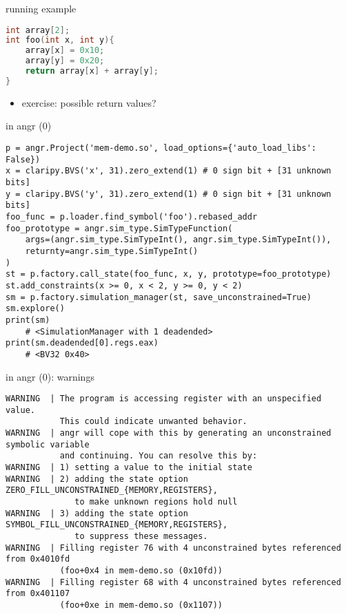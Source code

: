\begin{frame}[fragile]{running example}
\begin{lstlisting}[language=C,style=script]
int array[2];
int foo(int x, int y){
    array[x] = 0x10;
    array[y] = 0x20;
    return array[x] + array[y];
}
\end{lstlisting}
\begin{itemize}
\item exercise: possible return values?
\end{itemize}
\end{frame}

\begin{frame}[fragile]{in angr (0)}
\begin{Verbatim}[fontsize=\fontsize{9}{10}\selectfont]
p = angr.Project('mem-demo.so', load_options={'auto_load_libs': False})
x = claripy.BVS('x', 31).zero_extend(1) # 0 sign bit + [31 unknown bits]
y = claripy.BVS('y', 31).zero_extend(1) # 0 sign bit + [31 unknown bits]
foo_func = p.loader.find_symbol('foo').rebased_addr
foo_prototype = angr.sim_type.SimTypeFunction(
    args=(angr.sim_type.SimTypeInt(), angr.sim_type.SimTypeInt()),
    returnty=angr.sim_type.SimTypeInt()
)
st = p.factory.call_state(foo_func, x, y, prototype=foo_prototype)
st.add_constraints(x >= 0, x < 2, y >= 0, y < 2)
sm = p.factory.simulation_manager(st, save_unconstrained=True)
sm.explore()
print(sm)
    # <SimulationManager with 1 deadended>
print(sm.deadended[0].regs.eax)
    # <BV32 0x40>
\end{Verbatim}
\end{frame}

\begin{frame}[fragile]{in angr (0): warnings}
\begin{Verbatim}[fontsize=\fontsize{8}{9}]
WARNING  | The program is accessing register with an unspecified value.
           This could indicate unwanted behavior.
WARNING  | angr will cope with this by generating an unconstrained symbolic variable
           and continuing. You can resolve this by:
WARNING  | 1) setting a value to the initial state
WARNING  | 2) adding the state option ZERO_FILL_UNCONSTRAINED_{MEMORY,REGISTERS}, 
              to make unknown regions hold null
WARNING  | 3) adding the state option SYMBOL_FILL_UNCONSTRAINED_{MEMORY,REGISTERS},
              to suppress these messages.
WARNING  | Filling register 76 with 4 unconstrained bytes referenced from 0x4010fd
           (foo+0x4 in mem-demo.so (0x10fd))
WARNING  | Filling register 68 with 4 unconstrained bytes referenced from 0x401107
           (foo+0xe in mem-demo.so (0x1107))
\end{Verbatim}
\end{frame}

